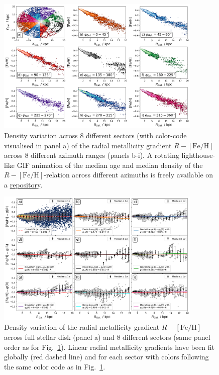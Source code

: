 \documentclass[fleqn,usenatbib]{mnras}
\begin{document}
\begin{figure}
    \centering
    \includegraphics[width=0.875\textwidth]{figures/radial_metallicity_gradients_mw_in_angles.png}
    \caption{Density variation across 8 different sectors (with color-code visualised in panel a) of the radial metallicity gradient $R-\mathrm{[Fe/H]}$ across 8 different azimuth ranges (panels b-i). A rotating lighthouse-like GIF animation of the median age and median density of the $R-\mathrm{[Fe/H]}$-relation across different azimuths is freely available on a \href{https://github.com/svenbuder/nihao_radial_metallicity_gradients/blob/main/figures/xyz_rfeh.gif}{repository}.}
    \label{fig:radial_metallicity_gradients_mw_in_angles}
\end{figure}

\begin{figure}
    \centering
    \includegraphics[width=0.875\textwidth]{figures/linear_radial_metallicity_gradients_mw_in_angles.png}
    \caption{Density variation of the radial metallicity gradient $R-\mathrm{[Fe/H]}$ across full stellar disk (panel a) and 8 different sectors (same panel order as for Fig.~\ref{fig:radial_metallicity_gradients_mw_in_angles}). Linear radial metallicity gradients have been fit globally (red dashed line) and for each sector with colors following the same color code as in Fig.~\ref{fig:radial_metallicity_gradients_mw_in_angles}.}    \label{fig:linear_radial_metallicity_gradients_mw_in_angles}
\end{figure}
\end{document}
